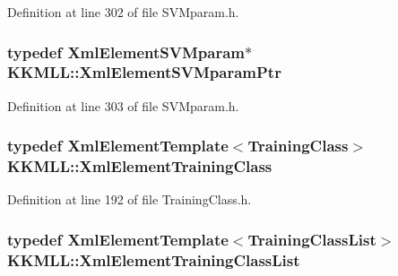 Definition at line 302 of file S\+V\+Mparam.\+h.

\subsubsection[{\texorpdfstring{Xml\+Element\+S\+V\+Mparam\+Ptr}{XmlElementSVMparamPtr}}]{\setlength{\rightskip}{0pt plus 5cm}typedef {\bf Xml\+Element\+S\+V\+Mparam}$\ast$ {\bf K\+K\+M\+L\+L\+::\+Xml\+Element\+S\+V\+Mparam\+Ptr}}\hypertarget{namespace_k_k_m_l_l_a087a995a76788f9d62f2bf4dde972646}{}\label{namespace_k_k_m_l_l_a087a995a76788f9d62f2bf4dde972646}


Definition at line 303 of file S\+V\+Mparam.\+h.

\subsubsection[{\texorpdfstring{Xml\+Element\+Training\+Class}{XmlElementTrainingClass}}]{\setlength{\rightskip}{0pt plus 5cm}typedef {\bf Xml\+Element\+Template}$<${\bf Training\+Class}$>$ {\bf K\+K\+M\+L\+L\+::\+Xml\+Element\+Training\+Class}}\hypertarget{namespace_k_k_m_l_l_a0f118c0155cb57cdd78c2bb6e7536353}{}\label{namespace_k_k_m_l_l_a0f118c0155cb57cdd78c2bb6e7536353}


Definition at line 192 of file Training\+Class.\+h.

\subsubsection[{\texorpdfstring{Xml\+Element\+Training\+Class\+List}{XmlElementTrainingClassList}}]{\setlength{\rightskip}{0pt plus 5cm}typedef {\bf Xml\+Element\+Template}$<${\bf Training\+Class\+List}$>$ {\bf K\+K\+M\+L\+L\+::\+Xml\+Element\+Training\+Class\+List}}\hypertarget{namespace_k_k_m_l_l_a85138db21d7188e00294cfc7cbbba814}{}\label{namespace_k_k_m_l_l_a85138db21d7188e00294cfc7cbbba814}


